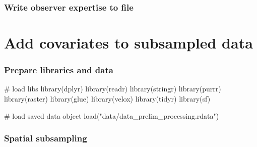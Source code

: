 \documentclass[]{article}
\newenvironment{Shaded}{}{}
\newcommand{\CommentTok}[1]{\textcolor[rgb]{0.00,0.50,0.00}{#1}}
\newcommand{\DataTypeTok}[1]{#1}
\newcommand{\KeywordTok}[1]{\textcolor[rgb]{0.00,0.00,1.00}{#1}}
\newcommand{\NormalTok}[1]{#1}
\newcommand{\OperatorTok}[1]{#1}
\newcommand{\StringTok}[1]{\textcolor[rgb]{0.00,0.50,0.50}{#1}}
\begin{document}
\hypertarget{write-observer-expertise-to-file}{%
\subsubsection{Write observer expertise to file}\label{write-observer-expertise-to-file}}

\begin{Shaded}
\end{Shaded}

\hypertarget{add-covariates-to-subsampled-data}{%
\section{Add covariates to subsampled data}\label{add-covariates-to-subsampled-data}}

\hypertarget{prepare-libraries-and-data}{%
\subsubsection{Prepare libraries and data}\label{prepare-libraries-and-data}}

\begin{Shaded}
\begin{Highlighting}[]

\CommentTok{# load libs}
\KeywordTok{library}\NormalTok{(dplyr)}
\KeywordTok{library}\NormalTok{(readr)}
\KeywordTok{library}\NormalTok{(stringr)}
\KeywordTok{library}\NormalTok{(purrr)}
\KeywordTok{library}\NormalTok{(raster)}
\KeywordTok{library}\NormalTok{(glue)}
\KeywordTok{library}\NormalTok{(velox)}
\KeywordTok{library}\NormalTok{(tidyr)}
\KeywordTok{library}\NormalTok{(sf)}

\CommentTok{# load saved data object}
\KeywordTok{load}\NormalTok{(}\StringTok{"data/data_prelim_processing.rdata"}\NormalTok{)}
\end{Highlighting}
\end{Shaded}

\hypertarget{spatial-subsampling}{%
\subsubsection{Spatial subsampling}\label{spatial-subsampling}}
\end{document}
